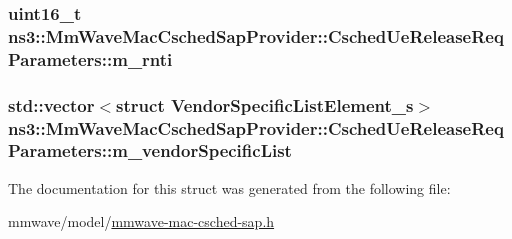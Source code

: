 \subsubsection[{\texorpdfstring{m\+\_\+rnti}{m_rnti}}]{\setlength{\rightskip}{0pt plus 5cm}uint16\+\_\+t ns3\+::\+Mm\+Wave\+Mac\+Csched\+Sap\+Provider\+::\+Csched\+Ue\+Release\+Req\+Parameters\+::m\+\_\+rnti}\hypertarget{structns3_1_1MmWaveMacCschedSapProvider_1_1CschedUeReleaseReqParameters_a538a326b6ac71cdd9ce19e291bdf31a7}{}\label{structns3_1_1MmWaveMacCschedSapProvider_1_1CschedUeReleaseReqParameters_a538a326b6ac71cdd9ce19e291bdf31a7}
\subsubsection[{\texorpdfstring{m\+\_\+vendor\+Specific\+List}{m_vendorSpecificList}}]{\setlength{\rightskip}{0pt plus 5cm}std\+::vector$<$struct {\bf Vendor\+Specific\+List\+Element\+\_\+s}$>$ ns3\+::\+Mm\+Wave\+Mac\+Csched\+Sap\+Provider\+::\+Csched\+Ue\+Release\+Req\+Parameters\+::m\+\_\+vendor\+Specific\+List}\hypertarget{structns3_1_1MmWaveMacCschedSapProvider_1_1CschedUeReleaseReqParameters_a1ffff42a1429147ed09a2b0254fff88a}{}\label{structns3_1_1MmWaveMacCschedSapProvider_1_1CschedUeReleaseReqParameters_a1ffff42a1429147ed09a2b0254fff88a}


The documentation for this struct was generated from the following file\+:\begin{DoxyCompactItemize}
\item 
mmwave/model/\hyperlink{mmwave-mac-csched-sap_8h}{mmwave-\/mac-\/csched-\/sap.\+h}\end{DoxyCompactItemize}
